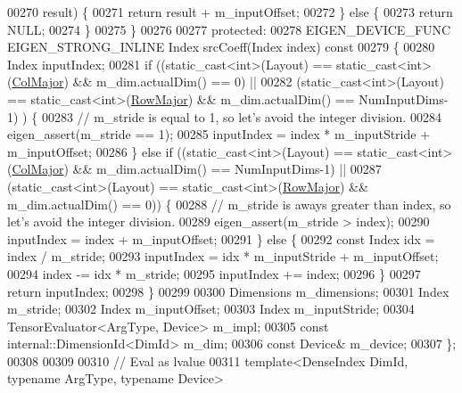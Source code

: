 \begin{DoxyCode}
00270         result) \{
00271       \textcolor{keywordflow}{return} result + m\_inputOffset;
00272     \} \textcolor{keywordflow}{else} \{
00273       \textcolor{keywordflow}{return} NULL;
00274     \}
00275   \}
00276 
00277  \textcolor{keyword}{protected}:
00278   EIGEN\_DEVICE\_FUNC EIGEN\_STRONG\_INLINE Index srcCoeff(Index index)\textcolor{keyword}{ const}
00279 \textcolor{keyword}{  }\{
00280     Index inputIndex;
00281     \textcolor{keywordflow}{if} ((static\_cast<int>(Layout) == static\_cast<int>(\hyperlink{group__enums_ggaacded1a18ae58b0f554751f6cdf9eb13a0cbd4bdd0abcfc0224c5fcb5e4f6669a}{ColMajor}) && m\_dim.actualDim() == 0) ||
00282     (static\_cast<int>(Layout) == \textcolor{keyword}{static\_cast<}\textcolor{keywordtype}{int}\textcolor{keyword}{>}(\hyperlink{group__enums_ggaacded1a18ae58b0f554751f6cdf9eb13acfcde9cd8677c5f7caf6bd603666aae3}{RowMajor}) && m\_dim.actualDim() == NumInputDims-1)
      ) \{
00283       \textcolor{comment}{// m\_stride is equal to 1, so let's avoid the integer division.}
00284       eigen\_assert(m\_stride == 1);
00285       inputIndex = index * m\_inputStride + m\_inputOffset;
00286     \} \textcolor{keywordflow}{else} \textcolor{keywordflow}{if} ((static\_cast<int>(Layout) == static\_cast<int>(\hyperlink{group__enums_ggaacded1a18ae58b0f554751f6cdf9eb13a0cbd4bdd0abcfc0224c5fcb5e4f6669a}{ColMajor}) && m\_dim.actualDim() == 
      NumInputDims-1) ||
00287            (static\_cast<int>(Layout) == \textcolor{keyword}{static\_cast<}\textcolor{keywordtype}{int}\textcolor{keyword}{>}(\hyperlink{group__enums_ggaacded1a18ae58b0f554751f6cdf9eb13acfcde9cd8677c5f7caf6bd603666aae3}{RowMajor}) && m\_dim.actualDim() == 0)) \{
00288       \textcolor{comment}{// m\_stride is aways greater than index, so let's avoid the integer division.}
00289       eigen\_assert(m\_stride > index);
00290       inputIndex = index + m\_inputOffset;
00291     \} \textcolor{keywordflow}{else} \{
00292       \textcolor{keyword}{const} Index idx = index / m\_stride;
00293       inputIndex = idx * m\_inputStride + m\_inputOffset;
00294       index -= idx * m\_stride;
00295       inputIndex += index;
00296     \}
00297     \textcolor{keywordflow}{return} inputIndex;
00298   \}
00299 
00300   Dimensions m\_dimensions;
00301   Index m\_stride;
00302   Index m\_inputOffset;
00303   Index m\_inputStride;
00304   TensorEvaluator<ArgType, Device> m\_impl;
00305   \textcolor{keyword}{const} internal::DimensionId<DimId> m\_dim;
00306   \textcolor{keyword}{const} Device& m\_device;
00307 \};
00308 
00309 
00310 \textcolor{comment}{// Eval as lvalue}
00311 \textcolor{keyword}{template}<DenseIndex DimId, \textcolor{keyword}{typename} ArgType, \textcolor{keyword}{typename} Device>

\end{DoxyCode}
